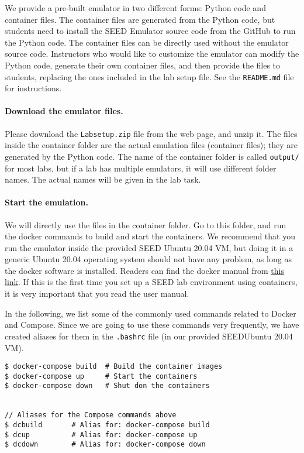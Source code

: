 We provide a pre-built emulator in two different forms: Python code
and container files. The container files are generated from
the Python code, but students need to install the SEED Emulator source
code from the GitHub to run the Python code. The container files
can be directly used without the emulator source code.
Instructors who would like to customize the emulator can modify the Python
code, generate their own container files, and then provide the
files to students, replacing the ones included in the
lab setup file. See the \texttt{README.md} file for instructions. 


\paragraph{Download the emulator files.}
Please download the \texttt{Labsetup.zip} file from the web page, and
unzip it. The files inside the container folder are the actual 
emulation files (container files); they are generated by the Python code.
The name of the container folder is called \texttt{output/} for most labs,
but if a lab has multiple emulators, it will use 
different folder names. The actual names will be given in the lab task.


\paragraph{Start the emulation.}
We will directly use the files in the container folder.
Go to this folder, and run the docker commands
to build and start the containers. We recommend that you run the emulator inside
the provided SEED Ubuntu 20.04 VM, but doing it in a generic Ubuntu 20.04 operating system
should not have any problem, as long as the docker software is installed.
Readers can find the docker manual from
\href{https://github.com/seed-labs/seed-labs/blob/master/manuals/docker/SEEDManual-Container.md}
{\underline{this link}}.
If this is the first time you set up a SEED lab environment
using containers, it is very important that you read 
the user manual. 


In the following, we list some of the commonly
used commands related to Docker and Compose. 
Since we are going to use 
these commands very frequently, we have created aliases for them
in the \texttt{.bashrc} file (in our provided SEEDUbuntu 20.04 VM).

\begin{lstlisting}
$ docker-compose build  # Build the container images
$ docker-compose up     # Start the containers
$ docker-compose down   # Shut don the containers


// Aliases for the Compose commands above
$ dcbuild       # Alias for: docker-compose build
$ dcup          # Alias for: docker-compose up
$ dcdown        # Alias for: docker-compose down
\end{lstlisting}


